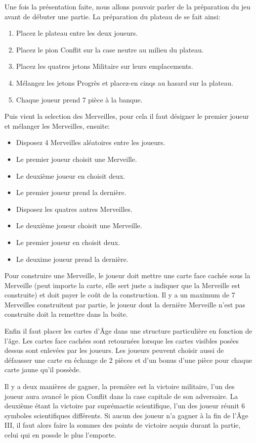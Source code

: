 \documentclass[a4paper, 12pt, french]{article}
\begin{document}
	Une fois la présentation faite, nous allons pouvoir parler de la préparation du jeu avant de débuter une partie.
	La préparation du plateau de se fait ainsi:
	\begin{enumerate}
		\item Placez le plateau entre les deux joueurs.
		\item Placez le pion Conflit sur la case neutre au milieu du plateau.
		\item Placez les quatres jetons Militaire sur leurs emplacements.
		\item Mélangez les jetons Progrès et placez-en cinqs au hasard sur la plateau.
		\item Chaque joueur prend 7 pièce à la banque.
	\end{enumerate}

	Puis vient la selection des Merveilles, pour cela il faut désigner le premier joueur et mélanger les Merveilles,
	ensuite:
	\begin{itemize}
		\item Disposez 4 Merveilles aléatoires entre les joueurs.
		\item Le premier joueur choisit une Merveille.
		\item Le deuxième joueur en choisit deux.
		\item Le premier joueur prend la dernière.
		\item Disposez les quatres autres Merveilles.
		\item Le deuxième joueur choisit une Merveille.
		\item Le premier joueur en choisit deux.
		\item Le deuxime joueur prend la dernière.
	\end{itemize}
	Pour construire une Merveille, le joueur doit mettre une carte face cachée sous la Merveille (peut importe
	la carte, elle sert juste a indiquer que la Merveille est construite) et doit payer le coût de la construction.
	Il y a un maximum de 7 Merveilles construitent par partie, le joueur dont la dernière Merveille n'est pas construite
	doit la remettre dans la boite.

	Enfin il faut placer les cartes d'Âge dans une structure particulière en fonction de l'âge. Les cartes face
	cachées sont retournées lorsque les cartes visibles posées dessus sont enlevées par les joueurs. Les joueurs
	peuvent choisir aussi de défausser une carte en échange de 2 pièces et d'un bonus d'une pièce pour chaque carte
	jaune qu'il possède.

	Il y a deux manières de gagner, la première est la victoire militaire, l'un des joueur aura avancé le pion
	Conflit dans la case capitale de son adversaire. La deuxième étant la victoire par suprémactie scientifique,
	l'un des joueur réunit 6 symboles scientifiques différents. Si aucun des joueur n'a gagner à la fin de l'Âge III,
	il faut alors faire la sommes des points de victoire acquis durant la partie, celui qui en possde le plus l'emporte.
\end{document}
